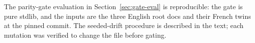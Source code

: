 \documentclass[11pt]{article}
\theoremstyle{definition}
\theoremstyle{plain}
\theoremstyle{remark}
\begin{document}
The parity-gate evaluation in Section~\ref{sec:gate-eval} is reproducible:
the gate is pure stdlib, and the inputs are the three English root docs and
their French twins at the pinned commit. The seeded-drift procedure is
described in the text; each mutation was verified to change the file before
gating.



\end{document}
